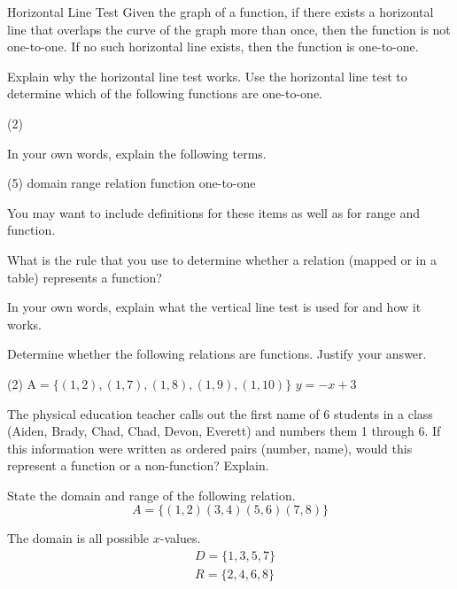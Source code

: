 \documentclass[12pt,fleqn]{book}
\newcommand{\prb}[1]{\begin{Exercise}#1\end{Exercise}}
\newcommand{\sol}[1]{\begin{Answer}#1\end{Answer}}
\begin{document}
\begin{defn}{Horizontal Line Test}{}
    Given the graph of a function, if there exists a horizontal line that overlaps the curve of the graph more than once, then the function is not one-to-one.  If no such horizontal line exists, then the function is one-to-one.
\end{defn}
Explain why the horizontal line test works.
\clearpage
Use the horizontal line test to determine which of the following functions are one-to-one.
\begin{tasks}(2)
    \task {}
    \task {}
    \task {}
    \task {}
    \task {}
    \task {}
\end{tasks}
\clearpage
\prb{
    In your own words, explain the following terms.
    \begin{tasks}(5)
        \task domain
        \task range
        \task relation
        \task function
        \task one-to-one
    \end{tasks}
    You may want to include definitions for these items as well as for range and function.
    \\[3in]
}
\prb{
    What is the rule that you use to determine whether a relation (mapped or in a table) represents a function?
    \\[1in]
}
\prb{
    In your own words, explain what the vertical line test is used for and how it works.
    \\[1in]
}
\prb{
    Determine whether the following relations are functions. Justify your answer.
    \begin{tasks}(2)
        \task $\mathrm{A}=\{(1,2),(1,7),(1,8),(1,9),(1,10)\}$
        \task $y=-x+3$
    \end{tasks}
    \clearpage
}
\prb{
    The physical education teacher calls out the first name of 6 students in a class (Aiden, Brady, Chad, Chad, Devon, Everett) and numbers them 1 through 6.
    If this information were written as ordered pairs (number, name), would this represent a function or a non-function? Explain.
    \\[1in]
}
\prb{State the domain and range of the following relation.
    \[
        A=\{(1,2)(3,4)(5,6)(7,8)\}
    \]
    \vspace{1in}
}
\sol{The domain is all possible $x$-values.
    \[
        \begin{aligned}
             & D=\{1,3,5,7\} \\
             & R=\{2,4,6,8\}
        \end{aligned}
    \]
}
\end{document}
